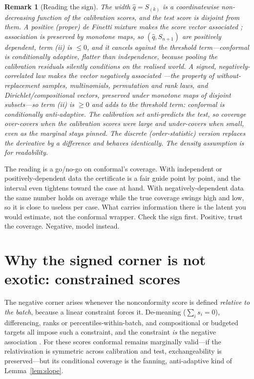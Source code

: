 \documentclass[11pt]{article}
\newtheorem{remark}{Remark}
\begin{document}
\begin{remark}[Reading the sign]
The width $\hat q=S_{(k)}$ is a coordinatewise non-decreasing function of the calibration
scores, and the test score is disjoint from them. A positive (proper) de Finetti mixture makes
the score vector \emph{associated} \citep{esary1967}; association is preserved by monotone
maps, so $(\hat q,S_{n+1})$ are positively dependent, term (ii) is $\le 0$, and it cancels
against the threshold term---conformal is \emph{conditionally adaptive}, flatter than
independence, because pooling the calibration residuals silently conditions on the realised
world. A signed, negatively-correlated law makes the vector \emph{negatively associated}
\citep{joagdev1983}---the property of without-replacement samples, multinomials, permutation
and rank laws, and Dirichlet/compositional vectors, preserved under monotone maps of disjoint
subsets---so term (ii) is $\ge 0$ and adds to the threshold term: conformal is
\emph{conditionally anti-adaptive}. The calibration set anti-predicts the test, so coverage
over-covers when the calibration scores were large and under-covers when small, even as the
marginal stays pinned. The discrete (order-statistic) version replaces the derivative by a
difference and behaves identically. The density assumption is for readability.
\end{remark}

The reading is a go/no-go on conformal's coverage. With independent or positively-dependent
data the certificate is a fair guide point by point, and the interval even tightens toward the
case at hand. With negatively-dependent data the same number holds on average while the true
coverage swings high and low, so it is close to useless per case. What carries information there
is the latent you would estimate, not the conformal wrapper. Check the sign first. Positive, trust the coverage. Negative, model instead.

\section{Why the signed corner is not exotic: constrained scores}

The negative corner arises whenever the nonconformity score is defined \emph{relative to the
batch}, because a linear constraint forces it. De-meaning ($\sum_i s_i=0$), differencing,
ranks or percentiles-within-batch, and compositional or budgeted targets all impose such a
constraint, and the constraint \emph{is} the negative association \citep{joagdev1983}. For
these scores conformal remains marginally valid---if the relativisation is symmetric across
calibration and test, exchangeability is preserved---but its conditional coverage is the
fanning, anti-adaptive kind of Lemma~\ref{lem:slope}.
\end{document}
